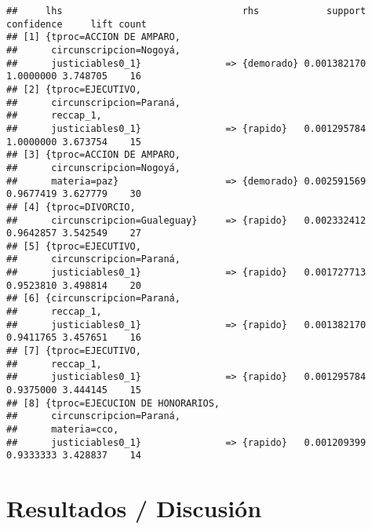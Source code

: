 \documentclass[runningheads,a4paper]{llncs}
\begin{document}
\begin{verbatim}
##     lhs                                rhs            support confidence     lift count
## [1] {tproc=ACCION DE AMPARO,                                                           
##      circunscripcion=Nogoyá,                                                           
##      justiciables0_1}               => {demorado} 0.001382170  1.0000000 3.748705    16
## [2] {tproc=EJECUTIVO,                                                                  
##      circunscripcion=Paraná,                                                           
##      reccap_1,                                                                         
##      justiciables0_1}               => {rapido}   0.001295784  1.0000000 3.673754    15
## [3] {tproc=ACCION DE AMPARO,                                                           
##      circunscripcion=Nogoyá,                                                           
##      materia=paz}                   => {demorado} 0.002591569  0.9677419 3.627779    30
## [4] {tproc=DIVORCIO,                                                                   
##      circunscripcion=Gualeguay}     => {rapido}   0.002332412  0.9642857 3.542549    27
## [5] {tproc=EJECUTIVO,                                                                  
##      circunscripcion=Paraná,                                                           
##      justiciables0_1}               => {rapido}   0.001727713  0.9523810 3.498814    20
## [6] {circunscripcion=Paraná,                                                           
##      reccap_1,                                                                         
##      justiciables0_1}               => {rapido}   0.001382170  0.9411765 3.457651    16
## [7] {tproc=EJECUTIVO,                                                                  
##      reccap_1,                                                                         
##      justiciables0_1}               => {rapido}   0.001295784  0.9375000 3.444145    15
## [8] {tproc=EJECUCION DE HONORARIOS,                                                    
##      circunscripcion=Paraná,                                                           
##      materia=cco,                                                                      
##      justiciables0_1}               => {rapido}   0.001209399  0.9333333 3.428837    14
\end{verbatim}

\normalsize

\section{Resultados / Discusión}\label{resultados-discusion}
\end{document}
